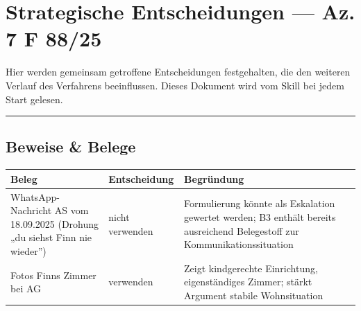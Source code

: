 \documentclass[
  11pt,
  a4paper,
]{article}
\newcounter{none}
\begin{document}

\section{Strategische Entscheidungen --- Az. 7 F
88/25}\label{strategische-entscheidungen-az.-7-f-8825}

Hier werden gemeinsam getroffene Entscheidungen festgehalten, die den
weiteren Verlauf des Verfahrens beeinflussen. Dieses Dokument wird vom
Skill bei jedem Start gelesen.

\begin{center}\rule{0.5\linewidth}{0.5pt}\end{center}

\subsection{Beweise \& Belege}\label{beweise-belege}

{\def\LTcaptype{none} %
\begin{longtable}[]{@{}
  >{\raggedright\arraybackslash}p{}
  >{\raggedright\arraybackslash}p{}
  >{\raggedright\arraybackslash}p{}@{}}
\toprule\noalign{}
\begin{minipage}[b]{\linewidth}\raggedright
Beleg
\end{minipage} & \begin{minipage}[b]{\linewidth}\raggedright
Entscheidung
\end{minipage} & \begin{minipage}[b]{\linewidth}\raggedright
Begründung
\end{minipage} \\
\midrule\noalign{}
\endhead
\bottomrule\noalign{}
\endlastfoot
WhatsApp-Nachricht AS vom 18.09.2025 (Drohung „du siehst Finn nie
wieder'') & nicht verwenden & Formulierung könnte als Eskalation
gewertet werden; B3 enthält bereits ausreichend Belegestoff zur
Kommunikationssituation \\
Fotos Finns Zimmer bei AG & verwenden & Zeigt kindgerechte Einrichtung,
eigenständiges Zimmer; stärkt Argument stabile Wohnsituation \\
\end{longtable}
}
\end{document}
